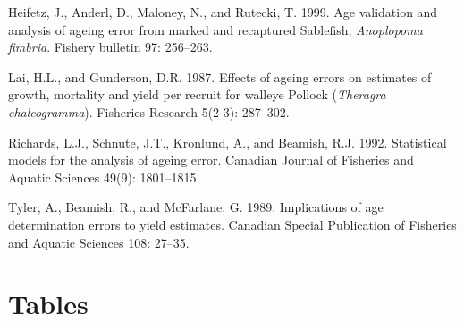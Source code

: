 \documentclass[11pt]{book}
\begin{document}
\leavevmode\hypertarget{ref-heifetz1999age}{}%
Heifetz, J., Anderl, D., Maloney, N., and Rutecki, T. 1999. Age validation and analysis of ageing error from marked and recaptured Sablefish, \emph{Anoplopoma fimbria}. Fishery bulletin 97: 256--263.

\leavevmode\hypertarget{ref-lai1987effects}{}%
Lai, H.L., and Gunderson, D.R. 1987. Effects of ageing errors on estimates of growth, mortality and yield per recruit for walleye Pollock (\emph{Theragra chalcogramma}). Fisheries Research 5(2-3): 287--302.

\leavevmode\hypertarget{ref-richards1992statistical}{}%
Richards, L.J., Schnute, J.T., Kronlund, A., and Beamish, R.J. 1992. Statistical models for the analysis of ageing error. Canadian Journal of Fisheries and Aquatic Sciences 49(9): 1801--1815.

\leavevmode\hypertarget{ref-tyler1989implications}{}%
Tyler, A., Beamish, R., and McFarlane, G. 1989. Implications of age determination errors to yield estimates. Canadian Special Publication of Fisheries and Aquatic Sciences 108: 27--35.

\setlength{\parindent}{0in} 
\setlength{\leftskip}{0in} 
\setlength{\parskip}{4pt}

\newpage
\setcounter{table}{0}

\hypertarget{tables}{%
\section{Tables}\label{tables}}
\end{document}
